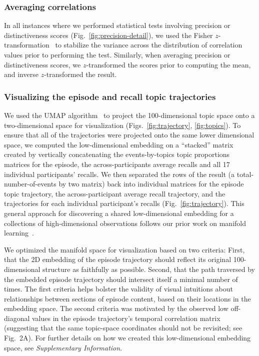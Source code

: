 \documentclass[10pt]{article}
\begin{document}
\subsubsection*{Averaging correlations}
In all instances where we performed statistical tests involving precision or distinctiveness scores (Fig.~\ref{fig:precision-detail}), we used the Fisher $z$-transformation~\citep{Fish25} to stabilize the variance across the distribution of correlation values prior to performing the test.  Similarly, when averaging precision or distinctiveness scores, we $z$-transformed the scores prior to computing the mean, and inverse $z$-transformed the result.

\subsubsection*{Visualizing the episode and recall topic trajectories}
We used the UMAP algorithm~\citep{McInEtal18} to project the 100-dimensional topic space onto a two-dimensional space for visualization (Figs.~\ref{fig:trajectory}, \ref{fig:topics}).  To ensure that all of the trajectories were projected onto the same lower dimensional space, we computed the low-dimensional embedding on a ``stacked'' matrix created by vertically concatenating the events-by-topics topic proportions matrices for the episode, the across-participants average recalls and all 17 individual participants' recalls.  We then separated the rows of the result (a total-number-of-events by two matrix) back into individual matrices for the episode topic trajectory, the across-participant average recall trajectory, and the trajectories for each individual participant's recalls (Fig.~\ref{fig:trajectory}).  This general approach for discovering a shared low-dimensional embedding for a collections of high-dimensional observations follows our prior work on manifold learning~\cite{HeusEtal18a}.

We optimized the manifold space for visualization based on two criteria: First, that the 2D embedding of the episode trajectory should reflect its original 100-dimensional structure as faithfully as possible. Second, that the path traversed by the embedded episode trajectory should intersect itself a minimal number of times.  The first criteria helps bolster the validity of visual intuitions about relationships between sections of episode content, based on their locations in the embedding space.  The second criteria was motivated by the observed low off-diagonal values in the episode trajectory's temporal correlation matrix (suggesting that the same topic-space coordinates should not be revisited; see Fig.~2A). For further details on how we created this low-dimensional embedding space, see \textit{Supplementary Information}.
\end{document}
